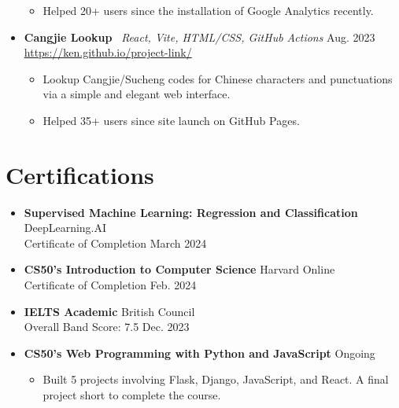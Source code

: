 \documentclass{article}
\begin{document}
\begin{itemize}
\begin{itemize}
              \item Helped 20+ users since the installation of Google Analytics recently.
          \end{itemize}
    \item \textbf{Cangjie Lookup} \, \textit{React, Vite, HTML/CSS, GitHub Actions} \hfill Aug. 2023 \\
          \href{https://kennethkn.github.io/.../}{https://ken.github.io/project-link/}
          \begin{itemize}
              \item Lookup Cangjie/Sucheng codes for Chinese characters and punctuations via a simple and elegant web interface.
              \item Helped 35+ users since site launch on GitHub Pages.
          \end{itemize}

\end{itemize}\vspace{-16pt}

\section{Certifications} %
\begin{itemize}

    \item \textbf{Supervised Machine Learning: Regression and Classification} \hfill DeepLearning.AI \\
          Certificate of Completion \hfill March 2024
    \item \textbf{CS50's Introduction to Computer Science} \hfill Harvard Online \\
          Certificate of Completion \hfill Feb. 2024
    \item \textbf{IELTS Academic} \hfill British Council \\
          Overall Band Score: 7.5 \hfill Dec. 2023
    \item \textbf{CS50's Web Programming with Python and JavaScript} \hfill Ongoing
          \begin{itemize}
              \item Built 5 projects involving Flask, Django, JavaScript, and React. A final project short to complete the course.
          \end{itemize}

\end{itemize}\vspace{-16pt}
\end{document}

